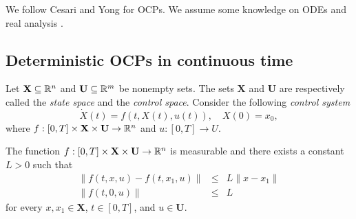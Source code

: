 We follow Cesari \cite{Cesari83} and Yong \cite{Yong2015} for OCPs. We assume some knowledge on ODEs \cite{Teschl} and real analysis \cite{Loeb2016}.

\subsection{Deterministic OCPs in continuous time}

Let $\mathbf{X}\subseteq\mathbb{R}^n$ and $\mathbf{U}\subseteq \mathbb{R}^m$ be nonempty sets. The sets $\mathbf{X}$ and $\mathbf{U}$ are 
respectively called the {\it state space} and the {\it control space}. Consider 
the following {\it control system}
\begin{equation}\label{CoDiffEq}
\dot{X}(t)=f(t,X(t),u(t)), \quad X(0)=x_0,
\end{equation}
where $f:[0,T]\times \mathbf{X}\times \mathbf{U}\to \mathbb{R}^n$ and $u:[0,T]\to U$. 

\begin{assumption}\label{Assum1}\rm  The function $f:[0,T]\times \mathbf{X}\times \mathbf{U}\to \mathbb{R}^n$
is measurable and there exists a constant $L>0$ such that
\begin{eqnarray}
  \|f(t,x,u)-f(t,x_1,u)\| & \leq & L\|x-x_1\|\label{LipfInx}\\
  \|f(t,0,u)\| & \leq & L\label{fBound}
\end{eqnarray}
for every $x,x_1\in \mathbf{X}$, $t\in[0,T]$, and $u\in \mathbf{U}$.
\end{assumption}


